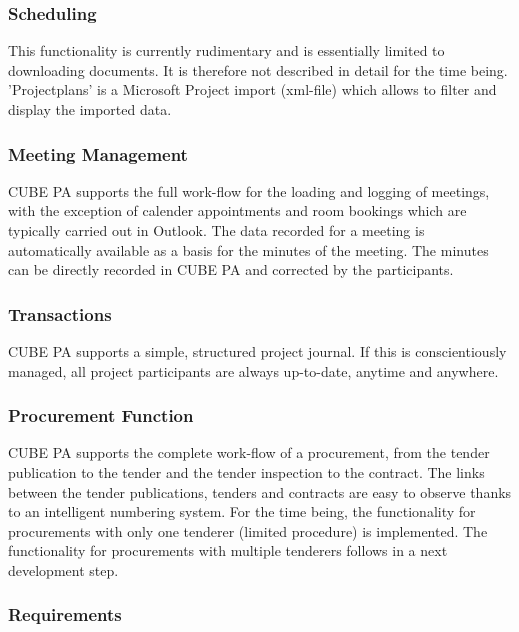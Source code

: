 \subsubsection{Scheduling} %

This functionality is currently rudimentary and is essentially limited to downloading documents. It is therefore not described in detail for the time being. 'Projectplans' is a Microsoft Project import (xml-file) which allows to filter and display the imported data.

\subsubsection{Meeting Management} %

CUBE PA supports the full work-flow for the loading and logging of meetings, with the exception of calender appointments and room bookings which are typically carried out in Outlook. The data recorded for a meeting is automatically available as a basis for the minutes of the meeting. The minutes can be directly recorded in CUBE PA and corrected by the participants.

\subsubsection{Transactions} %

CUBE PA supports a simple, structured project journal. If this is conscientiously managed, all project participants are always up-to-date, anytime and anywhere.

\subsubsection{Procurement Function} %

CUBE PA supports the complete work-flow of a procurement, from the tender publication to the tender and the tender inspection to the contract. The links between the tender publications, tenders and contracts are easy to observe thanks to an intelligent numbering system. For the time being, the functionality for procurements with only one tenderer (limited procedure) is implemented. The functionality for procurements with multiple tenderers follows in a next development step.

\subsubsection{Requirements} %


